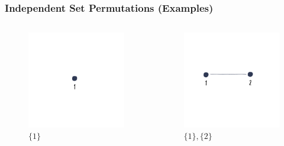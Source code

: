 \documentclass[10pt,aspectratio=43]{beamer}
\begin{document}
\begin{frame}
  \frametitle{Independent Set Permutations (Examples)}
  
  \begin{columns}[c]
    \begin{column}{0.48\textwidth}
      \begin{figure}
        \centering
        \includegraphics[width=0.85\linewidth]{figures/lec/i1.png}
        \caption {$\{1\}$}
      \end{figure}
    \end{column}
    \begin{column}{0.48\textwidth}
      \begin{figure}
        \centering
        \includegraphics[width=0.85\linewidth]{figures/lec/i2.png}
        \caption {$\{1\}, \{2\}$}
      \end{figure}
    \end{column}
  \end{columns}
\end{frame}
\end{document}
